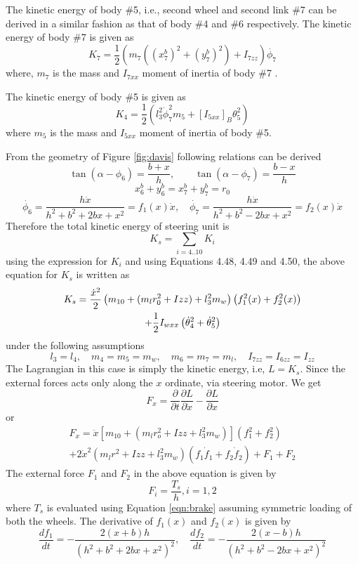 {The kinetic energy of body \#5, i.e., second wheel and second link \#7 can be derived in a similar fashion as that of body \#4 and \#6 respectively. The kinetic energy of body \#7 is given as
\begin{equation}
K_7=\frac{1}{2}(m_7((x^b_7)^2+(y^b_7)^2)+I_{7zz})\dot{\phi_7}
\end{equation}
where, $m_7$ is the mass and  $I_{7xx}$ moment of inertia of body \#7 .

The kinetic energy of body \#5  is given as
 \begin{equation}
K_4=\frac{1}{2}(l_3^2\dot\phi_7^2m_5+[I_{5xx}]_B\theta_5^2)
\end{equation} 
 where $m_5$  is the mass and $I_{5xx}$ moment of inertia of body \#5.
 

From the geometry of Figure \ref{fig:davis} following relations can be derived 
\begin{equation}
\label{eqn:thetaTox}
\tan(\alpha-\phi_6)=\frac{b+x}{h}, \quad \quad \tan(\alpha-\phi_7)=\frac{b-x}{h}
\end{equation}
\begin{equation}
\label{ro}
x^b_6+y^b_6=x^b_7+y^b_7=r_0
\end{equation}
\begin{equation}
\dot{\phi_6}=\dfrac{h\dot x}{h^2+b^2+2bx+x^2}=f_1(x)\dot x,\quad \dot{\phi_7}=\dfrac{h\dot x}{h^2+b^2-2bx+x^2}=f_2(x)\dot x
\end{equation}
 Therefore the total kinetic energy of steering unit is 
\[K_s=\sum_{i=4..10}K_i\]
using the expression for $K_i$  and using Equations 4.48, 4.49 and 4.50, the above equation for $K_s$  is written as 
\begin{multline}
	K_s=\frac{\dot x^2}{2} \left( m_{10}+(m_l r^2_0+I{zz})+l^2_3m_w \right) \left(f^2_1(x)+f^2_2(x) \right)\\ + \frac{1}{2} I_{wxx}\left(\dot\theta^2_4  +\dot\theta^2_5\right)
\end{multline}
under the following assumptions \[l_3=l_4, \quad m_4=m_5=m_w, \quad m_6=m_7=m_l, \quad I_{7zz}=I_{6zz}=I_{zz}\]
The Lagrangian in this case is simply the kinetic energy, i.e,  $L=K_s$. Since the external forces acts only along the $x$ ordinate, via steering motor. We get
\[F_x= \dfrac{\partial}{\partial t}\dfrac{\partial L}{\partial \dot x} - \dfrac{\partial L}{\partial x}\]
or 
\begin{multline}
\label{eqn:SteerDyn}
F_x=\ddot{x}\left[ m_{10}+\left(m_lr_o^2+I{zz}+l^2_3m_w \right) \right] \left( f_1^2+f_2^2 \right)\\
+2\dot x^2 \left(m_lr^2+I{zz}+l_3^2 m_w \right) \left( f_1 \dot f_1 +f_2 \dot f_2\right)+F_1+F_2
\end{multline}
The external force $F_1$ and $F_2$ in the above equation is given by
\[F_i=\dfrac{T_s}{h},i={1,2} \]
where $T_s$ is evaluated using Equation \ref{eqn:brake} assuming symmetric loading of both the wheels. The derivative of $f_1(x)$ and  $f_2(x)$ is given by 
\[ \dfrac{df_1}{dt}=-\dfrac{2(x+b)h}{(h^2+b^2+2bx+x^2)^2}, \quad \dfrac{df_2}{dt}=-\dfrac{2(x-b)h}{(h^2+b^2-2bx+x^2)^2}\]



}

